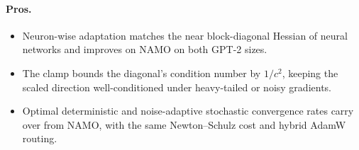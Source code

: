 \paragraph{Pros.}
\begin{itemize}[leftmargin=*]
\item Neuron-wise adaptation matches the near block-diagonal Hessian of neural networks
  and improves on NAMO on both GPT-2 sizes.
\item The clamp bounds the diagonal's condition number by $1/c^2$, keeping the scaled
  direction well-conditioned under heavy-tailed or noisy gradients.
\item Optimal deterministic and noise-adaptive stochastic convergence rates carry over
  from NAMO, with the same Newton--Schulz cost and hybrid AdamW routing.
\end{itemize}

